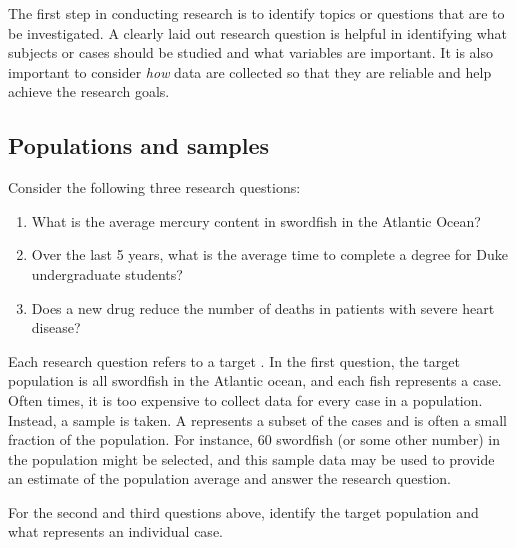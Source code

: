 The first step in conducting research is to identify topics
or questions that are to be investigated.
A clearly laid out research question is helpful in identifying
what subjects or cases should be studied and what variables are
important.
It is also important to consider \emph{how} data are collected
so that they are reliable and help achieve the research goals.



\subsection{Populations and samples}
\label{populationsAndSamples}

\noindent%
Consider the following three research questions:
\begin{enumerate}
\setlength{\itemsep}{0mm}
\item What is the average mercury content in swordfish in the Atlantic Ocean?
\item\label{timeToGraduationQuestionForUCLAStudents} Over the last 5 years, what is the average time to complete a degree for Duke undergraduate students?
\item\label{identifyPopulationOfStentStudy} Does a new drug reduce the number of deaths in patients with severe heart disease?
\end{enumerate}
Each research question refers to a target . In the first question, the target population is all swordfish in the Atlantic ocean, and each fish represents a case. Often times, it is too expensive to collect data for every case in a population. Instead, a sample is taken. A  represents a subset of the cases and is often a small fraction of the population. For instance, 60 swordfish (or some other number) in the population might be selected, and this sample data may be used to provide an estimate of the population average and answer the research question.

\begin{exercisewrap}
\begin{nexercise}\label{identifyingThePopulationForTwoQuestionsInPopAndSampSubsection}%
For the second and third questions above,
identify the target population and what
represents an individual case.\footnotemark
\end{nexercise}
\end{exercisewrap}


